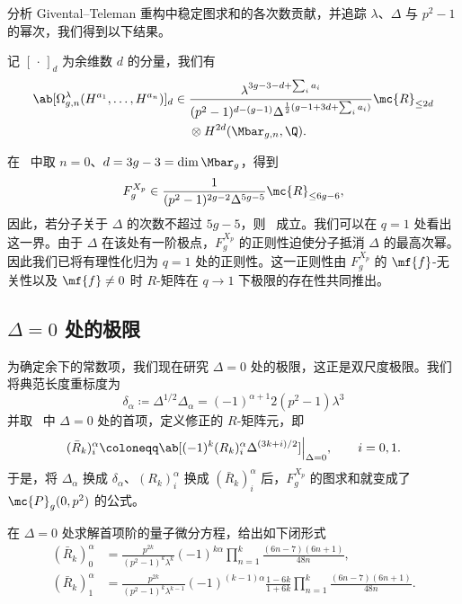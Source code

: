 分析 Givental--Teleman 重构中稳定图求和的各次数贡献，并追踪 \(\lambda\)、\(\Delta\) 与 \(p^2-1\) 的幂次，我们得到以下结果。

\begin{thm}%
\label{thm:local P1 reconstruction}
    记 \([\,\cdot\,]_d\) 为余维数 \(d\) 的分量，我们有
    \begin{align*}
        \ab[\Omega^{\lambda}_{g,n}(H^{a_1},\ldots,H^{a_n})]_d \in{}& \frac{\lambda^{3g-3-d+\sum_i a_i}}{(p^2-1)^{d-(g-1)}\Delta^{\frac{1}{2}(g-1+3d+\sum_i a_i)}}\mc{R}_{\leq 2d} \\
        &\otimes H^{2d}(\Mbar_{g,n},\Q).
    \end{align*}
\end{thm}

在~ 中取 \(n=0\)、\(d = 3g-3 = \dim \Mbar_g\)，得到
\[ F_g^{X_p} \in \frac{1}{(p^2-1)^{2g-2}\Delta^{5g-5}}\mc{R}_{\leq 6g-6}, \]
因此，若分子关于 \(\Delta\) 的次数不超过 \(5g-5\)，则~ 成立。我们可以在 \(q=1\) 处看出这一界。由于 \(\Delta\) 在该处有一阶极点，\(F_g^{X_p}\) 的正则性迫使分子抵消 \(\Delta\) 的最高次幂。因此我们已将有理性化归为 \(q=1\) 处的正则性。这一正则性由 \(F_g^{X_p}\) 的 \(\mf{f}\)-无关性以及 \(\mf{f} \neq 0\) 时 \(R\)-矩阵在 \(q \to 1\) 下极限的存在性共同推出。

\subsection{\(\Delta = 0\) 处的极限}%
\label{sub:The limit Delta = 0}

为确定余下的常数项，我们现在研究 \(\Delta = 0\) 处的极限，这正是双尺度极限。我们将典范长度重标度为
\[ \delta_{\alpha} \coloneqq \Delta^{1/2}\Delta_{\alpha} = (-1)^{\alpha+1}2(p^2-1)\lambda^3 \]
并取~ 中 \(\Delta = 0\) 处的首项，定义修正的 \(R\)-矩阵元，即
\[ (\bar{R}_k)_i^{\alpha} \coloneqq \ab[(-1)^k (R_k)_i^{\alpha}\Delta^{(3k+i)/2}]\Big|_{\Delta=0}, \qquad i = 0,1. \]
于是，将 \(\Delta_{\alpha}\) 换成 \(\delta_{\alpha}\)、\((R_k)_i^{\alpha}\) 换成 \((\bar{R}_k)_i^{\alpha}\) 后，\(F_g^{X_p}\) 的图求和就变成了 \(\mc{P}_g(0,p^2)\) 的公式。

\begin{lem}%
\label{lem:R matrix at Delta zero}
    在 \(\Delta = 0\) 处求解首项阶的量子微分方程，给出如下闭形式
    \begin{align*}
        (\bar{R}_k)_0^{\alpha} &= \frac{p^{2k}}{(p^2-1)^k\lambda^k}(-1)^{k\alpha}\prod_{n=1}^k \frac{(6n-7)(6n+1)}{48n}, \\
        (\bar{R}_k)_1^{\alpha} &= \frac{p^{2k}}{(p^2-1)^k \lambda^{k-1}}(-1)^{(k-1)\alpha}\frac{1-6k}{1+6k}\prod_{n=1}^k \frac{(6n-7)(6n+1)}{48n}.
    \end{align*}
\end{lem}

